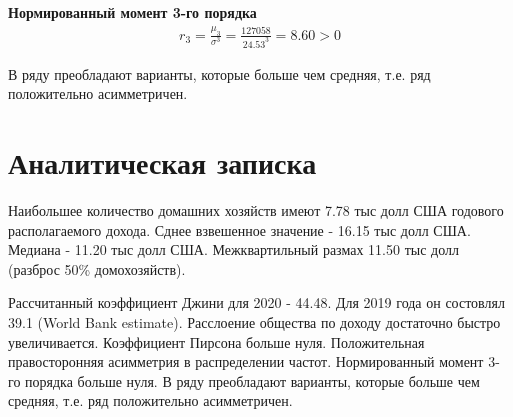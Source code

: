 \documentclass[a4paper,11pt]{article}
\begin{document}
\textbf{Нормированный момент 3-го порядка}
\begin{align*}
r_3 = \frac{\mu_3}{\sigma^3} = \frac{127058}{24.53^3} = 8.60 > 0
\end{align*}

В ряду преобладают варианты, которые больше чем средняя, т.е. ряд положительно асимметричен.

\section{Аналитическая записка}

\noindent
Наибольшее количество домашних хозяйств имеют 7.78 тыс долл США годового располагаемого дохода. Сднее взвешенное значение - 16.15 тыс долл США. Медиана - 11.20 тыс долл США. Межквартильный размах 11.50 тыс долл (разброс 50\% домохозяйств).

Рассчитанный коэффициент Джини для 2020 - 44.48. Для 2019 года он состовлял 39.1 (World Bank estimate). Расслоение общества по доходу достаточно быстро увеличивается. Коэффициент Пирсона больше нуля. Положительная правосторонняя
асимметрия в распределении частот. Нормированный момент 3-го порядка больше нуля. В ряду преобладают варианты, которые больше чем средняя, т.е. ряд положительно асимметричен.









\end{document}
